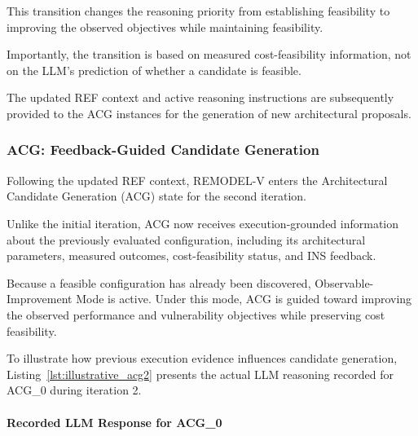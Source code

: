 This transition changes the reasoning
priority from establishing feasibility
to improving the observed objectives
while maintaining feasibility.

Importantly, the transition is based
on measured cost-feasibility information,
not on the LLM's prediction of whether
a candidate is feasible.

The updated REF context and active
reasoning instructions are subsequently
provided to the ACG instances for
the generation of new architectural
proposals.


\subsubsection{ACG: Feedback-Guided Candidate Generation}
\label{app:illustrative_acg2}

Following the updated REF context, REMODEL-V
enters the Architectural Candidate Generation
(ACG) state for the second iteration.

Unlike the initial iteration, ACG now receives
execution-grounded information about the
previously evaluated configuration, including
its architectural parameters, measured outcomes,
cost-feasibility status, and INS feedback.

Because a feasible configuration has already
been discovered, Observable-Improvement Mode
is active. Under this mode, ACG is guided
toward improving the observed performance
and vulnerability objectives while preserving
cost feasibility.

To illustrate how previous execution evidence
influences candidate generation,
Listing~\ref{lst:illustrative_acg2}
presents the actual LLM reasoning recorded
for ACG\_0 during iteration 2.

\paragraph{Recorded LLM Response for ACG\_0}

